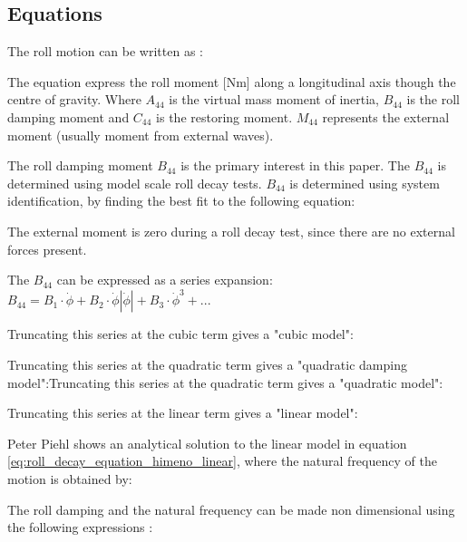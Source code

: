 \subsection{Equations}
\label{se:equations}
The roll motion can be written as \cite{himeno_prediction_1981}:


The equation express the roll moment [Nm] along a longitudinal axis though the centre of gravity.
Where $A_{44}$ is the virtual mass moment of inertia, $B_{44}$ is the roll damping moment and $C_{44}$ is the restoring moment. $M_{44}$ represents the external moment (usually moment from external waves).

The roll damping moment $B_{44}$ is the primary interest in this paper. The $B_{44}$ is determined using model scale roll decay tests. $B_{44}$ is determined using system identification, by finding the best fit to the following equation:

The external moment is zero during a roll decay test, since there are no external forces present.

The $B_{44}$ can be expressed as a series expansion:  
$ B_{44} = B_1\cdot\dot{\phi} + B_2\cdot\dot{\phi}\left|\dot{\phi}\right| + B_3\cdot\dot{\phi}^3 + ...$

Truncating this series at the cubic term gives a "cubic model":


Truncating this series at the quadratic term gives a "quadratic damping model":Truncating this series at the quadratic term gives a "quadratic model":


Truncating this series at the linear term gives a "linear model":


Peter Piehl \cite{henry_peter_piehl_ship_nodate} shows an analytical solution to the linear model in equation \ref{eq:roll_decay_equation_himeno_linear}, where the natural frequency of the motion is obtained by:


The roll damping and the natural frequency can be made non dimensional using the following expressions \cite{himeno_prediction_1981}: 


